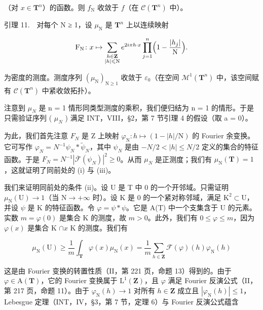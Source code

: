 （对 \(x\in \mathbf{T}^n\)）的函数。则 \(f_{\mathrm{N}}\) 收敛于 \(f\)（在 \(\mathcal{C}(\mathbf{T}^n)\) 中）。

引理 11.　对每个 N ≥ 1，设 \(\mu_{\mathrm{N}}\) 是 \(\mathbf{T}^{n}\) 上以连续映射

\[
\mathrm{F}_{\mathrm{N}}\colon x\mapsto \sum_{\substack{h\in \mathbf{Z}\\ |h|\leqslant \mathrm{N}}}e^{2i\pi h\cdot x}\prod_{j = 1}^{n}\Bigl (1 - \frac{|h_{j}|}{\mathrm{N}}\Bigr).
\]

为密度的测度。测度序列 \((\mu_{\mathrm{N}})_{\mathrm{N}\geqslant1}\) 收敛于 \(\varepsilon_{0}\)（在空间 \(\mathcal{M}^{1}(\mathbf{T}^{n})\) 中，该空间赋有 \(\mathcal{C}(\mathbf{T}^{n})\) 中紧收敛拓扑）。

注意到 \(\mu_{N}\) 是 n = 1 情形同类型测度的乘积，我们便归结为 n = 1 的情形。于是只需验证序列 ( \(\mu_{N}\) ) 满足 INT，VIII，§2，第 7 节引理 4 的假设（取 a = 0）。

为此，我们首先注意 \(F_{N}\) 是 Z 上映射 \(\varphi_{\mathrm{N}}\colon h\mapsto(1-|h|/\mathrm{N})\) 的 Fourier 余变换。它可写作 \(\varphi_{N}=N^{-1}\psi_{N}*\widetilde{\psi}_{N}\)，其中 \(\psi_{N}\) 是由 \(-N/2<|h|\leqslant N/2\) 定义的集合的特征函数。于是 \(F_{N}=N^{-1}|\overline{\mathcal{F}}(\psi_{N})|^{2}\geqslant0\)。从而 \(\mu_{N}\) 是正测度；我们有 \(\mu_{\mathrm{N}}(\mathbf{T})=1\)，这就证明了同前处的 (i) 与 (iii)。

我们来证明同前处的条件 (ii)。设 U 是 T 中 0 的一个开邻域。只需证明 \(\mu_{\mathrm{N}}(\mathrm{U}) \to 1\)（当 \(\mathrm{N} \to +\infty\) 时）。设 K 是 0 的一个紧对称邻域，满足 \(\mathrm{K}^2 \subset \mathrm{U}\)，并设 \(\psi\) 是 K 的特征函数。令 \(\varphi = \psi * \psi\)。它是 A(T) 中一个支集含于 U 的元素。实数 \(m = \varphi(0)\) 是集合 K 的测度，故 \(m > 0\)。此外，我们有 \(0 \leqslant \varphi \leqslant m\)，因为 \(\varphi(x)\) 是集合 K \(\cap x\) K 的测度。我们有

\[
\mu_ {\mathrm{N}} (\mathrm{U}) \geqslant \frac {1}{m} \int_ {\mathbf {T}} \varphi (x) \mu_ {\mathrm{N}} (x) = \frac {1}{m} \sum_ {h \in \mathbf {Z}} \mathcal {F} (\varphi) (h) \varphi_ {\mathrm{N}} (h)
\]

这是由 Fourier 变换的转置性质（II，第 221 页，命题 13）得到的。由于 \(\varphi \in \mathrm{A}(\mathbf{T})\)，它的 Fourier 变换属于 \(\mathrm{L}^1 (\mathbf{Z})\)，且 \(\varphi\) 满足 Fourier 反演公式（II，第 217 页，命题 11）。由于 \(\varphi_{\mathrm{N}}(h)\to 1\) 对所有 \(h\in \mathbf{Z}\) 成立且 \(|\varphi_{\mathrm{N}}(h)|\leqslant 1\)，Lebesgue 定理（INT，IV，§3，第 7 节，定理 6）与 Fourier 反演公式蕴含

